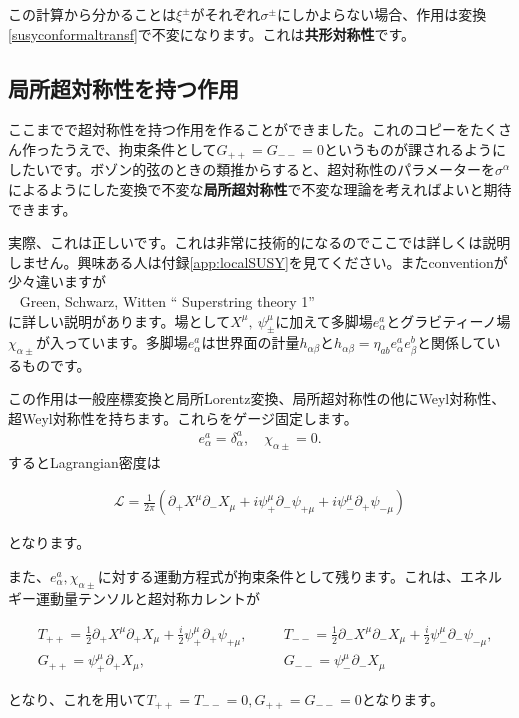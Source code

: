 \documentclass[report,paper=a4, fontsize=12pt, line_length=16cm, number_of_lines=33,dvipdfmx]{jlreq}
\newenvironment{important}{\begin{tcolorbox}[
  colback = white,
  colframe = red!35,
  boxrule = 2mm,
  fonttitle = \bfseries,
  after = \noindent] }{\end{tcolorbox}}
\newenvironment{mycite}{\\ \qquad \textbullet\ }{\\}
\numberwithin{equation}{chapter}
\numberwithin{equation}{section}
\newcommand{\del}{\partial}
\newcommand{\kyou}[1]{{\sffamily \bfseries #1}}
\newcommand{\Lcal}{\mathcal{L}}
\begin{document}
この計算から分かることは$\xi^{\pm}$がそれぞれ$\sigma^{\pm}$にしかよらない場合、作用は変換\eqref{susyconformaltransf}で不変になります。これは\kyou{共形対称性}です。

\subsection{局所超対称性を持つ作用}
ここまでで超対称性を持つ作用を作ることができました。これのコピーをたくさん作ったうえで、拘束条件として$G_{++}=G_{--}=0$というものが課されるようにしたいです。ボゾン的弦のときの類推からすると、超対称性のパラメーターを$\sigma^{\alpha}$によるようにした変換で不変な\kyou{局所超対称性}で不変な理論を考えればよいと期待できます。

実際、これは正しいです。これは非常に技術的になるのでここでは詳しくは説明しません。興味ある人は付録\ref{app:localSUSY}を見てください。またconventionが少々違いますが
\begin{mycite}
  Green, Schwarz, Witten `` Superstring theory 1''
\end{mycite}
に詳しい説明があります。場として$X^{\mu},\ \psi^{\mu}_{\pm}$に加えて多脚場$e^{a}_{\alpha}$とグラビティーノ場$\chi_{\alpha \pm}$が入っています。多脚場$e^{a}_{\alpha}$は世界面の計量$h_{\alpha\beta}$と$h_{\alpha\beta}=\eta_{ab}e^{a}_{\alpha}e^{b}_{\beta}$と関係しているものです。

この作用は一般座標変換と局所Lorentz変換、局所超対称性の他にWeyl対称性、超Weyl対称性を持ちます。これらをゲージ固定します。
\begin{align}
  e^{a}_{\alpha}=\delta^{a}_{\alpha},\quad \chi_{\alpha \pm}=0.
\end{align}
するとLagrangian密度は
\begin{important}
  \begin{align}
    \Lcal = \frac{1}{2\pi}\left( 
      \del_{+}X^{\mu}\del_{-}X_{\mu}+i\psi^{\mu}_{+}\del_{-}\psi_{+\mu}
      +i\psi^{\mu}_{-}\del_{+}\psi_{-\mu}
     \right)
     \label{supergaugefixedaction}
  \end{align}    
\end{important}
となります。

また、$e^{a}_{\alpha},\chi_{\alpha\pm}$に対する運動方程式が拘束条件として残ります。これは、エネルギー運動量テンソルと超対称カレントが
\begin{important}
  \begin{align}
    &T_{++}=\frac12\del_{+}X^{\mu}\del_{+}X_{\mu}+\frac{i}{2}\psi^{\mu}_{+}\del_{+}\psi_{+\mu},\quad &&
  T_{--}=\frac12\del_{-}X^{\mu}\del_{-}X_{\mu}+\frac{i}{2}\psi^{\mu}_{-}\del_{-}\psi_{-\mu},\nonumber\\
  &G_{++}=\psi^{\mu}_{+}\del_{+}X_{\mu},&&
  G_{--}=\psi^{\mu}_{-}\del_{-}X_{\mu}
  \end{align}    
\end{important}
となり、これを用いて$T_{++}=T_{--}=0,G_{++}=G_{--}=0$となります。
\end{document}

